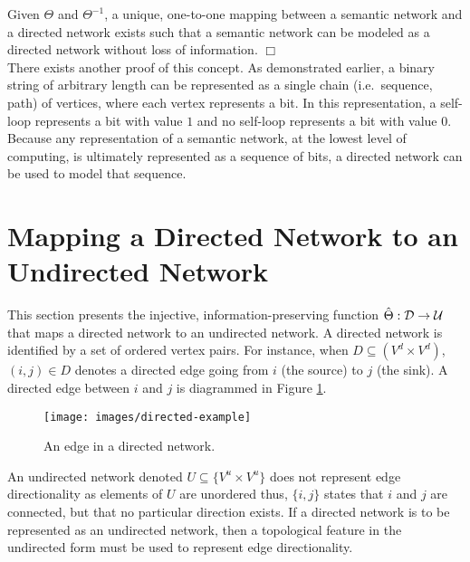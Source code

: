 \documentclass[twocolumn,preprintnumbers,amsmath,amssymb,letter]{revtex4}
\newcommand{\rar}{\rightarrow}
\newcommand{\qed}{\hfill $\Box$ \hfill \\}
\begin{document}
Given $\Theta$ and $\Theta^{-1}$, a unique, one-to-one mapping between a semantic network and a directed network exists such that a semantic network can be modeled as a directed network without loss of information. \qed

There exists another proof of this concept. As demonstrated earlier, a binary string of arbitrary length can be represented as a single chain (i.e.~sequence, path) of vertices, where each vertex represents a bit. In this representation, a self-loop represents a bit with value $1$ and no self-loop represents a bit with value $0$. Because any representation of a semantic network, at the lowest level of computing, is ultimately represented as a sequence of bits, a directed network can  be used to model that sequence.

\section{Mapping a Directed Network to an Undirected Network\label{sec:dir-to-und}}

This section presents the injective, information-preserving function $\hat{\Theta} : \cal{D} \rar \cal{U}$ that maps a directed network to an undirected network. A directed network is identified by a set of ordered vertex pairs. For instance, when $D \subseteq (V^d \times V^d)$, $(i,j) \in D$ denotes a directed edge going from $i$ (the source) to $j$ (the sink). A directed edge between $i$ and $j$ is diagrammed in Figure \ref{fig:directed-example}.
\begin{figure}[h!]
	\centering
	\texttt{[image: images/directed-example]}
	 \caption{\label{fig:directed-example}An edge in a directed network.}
\end{figure}

An undirected network denoted $U \subseteq \{V^u \times V^u\}$ does not represent edge directionality as elements of $U$ are unordered thus, $\{i,j\}$ states that $i$ and $j$ are connected, but that no particular direction exists. If a directed network is to be represented as an undirected network, then a topological feature in the undirected form must be used to represent edge directionality.
\end{document}

